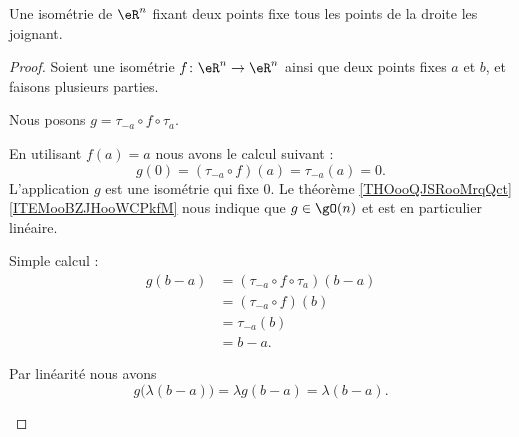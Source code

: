 \begin{proposition}	\label{LEMooURUZooYYDiFY}
	Une isométrie de \( \eR^n\) fixant deux points fixe tous les points de la droite les joignant.
\end{proposition}

\begin{proof}
	Soient une isométrie \(f \colon \eR^n\to \eR^n  \) ainsi que deux points fixes \( a\) et \( b\), et faisons plusieurs parties.
	\begin{subproof}
		Nous posons \( g=\tau_{-a}\circ f\circ \tau_a\).

		En utilisant \( f(a)=a\) nous avons le calcul suivant :
		\begin{equation}
			g(0)=(\tau_{-a}\circ f)(a)=\tau_{-a}(a)=0.
		\end{equation}
		L'application \( g\) est une isométrie qui fixe \( 0\). Le théorème \ref{THOooQJSRooMrqQct}\ref{ITEMooBZJHooWCPkfM} nous indique que \( g\in\gO(n)\) et est en particulier linéaire.

		\spitem[\( g\) fixe \( b-a\)]
		Simple calcul :
		\begin{subequations}
			\begin{align}
				g(b-a) & =(\tau_{-a}\circ f\circ \tau_a)(b-a) \\
				       & =(\tau_{-a}\circ f)(b)               \\
				       & =\tau_{-a}(b)                        \\
				       & =b-a.
			\end{align}
		\end{subequations}

		Par linéarité nous avons
		\begin{equation}
			g\big( \lambda(b-a) \big)=\lambda g(b-a)=\lambda(b-a).
		\end{equation}


\end{subproof}
\end{proof}
